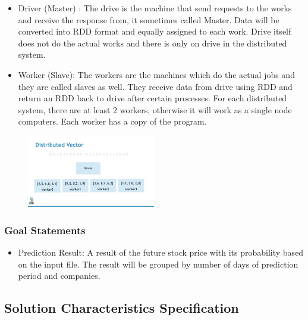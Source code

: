 \documentclass[12pt]{article}
\newcounter{goalnum} %
\begin{document}
\begin{itemize}

\item Driver (Master) : 
The drive is the machine that send requests to the works and receive the response from, it sometimes called Master. Data will be converted into RDD format and equally assigned to each work. Drive itself does not do the actual works and there is only on drive in the distributed system.

\item Worker (Slave): 
The workers are the machines which do the actual jobs and they are called slaves as well. They receive data from drive using RDD and return an RDD back to drive after certain processes. For each distributed system, there are at least 2 workers, otherwise it will work as a single node computers. Each worker has a copy of the program. 


\end{itemize}


\begin{figure}[h!]
\begin{center}
{
\includegraphics[width=0.5\textwidth]{sparkrdd.png}
}
\caption{\label{Spark}}
\end{center}
\end{figure}

\subsubsection{Goal Statements}

\begin{itemize}

\item Prediction
Result\thegoalnum \label{G_meaningfulLabel}: A result
of the future stock price with its probability based on the input file. The result will be grouped by number of days of prediction period and companies.


\end{itemize}

\subsection{Solution Characteristics Specification}
\end{document}
